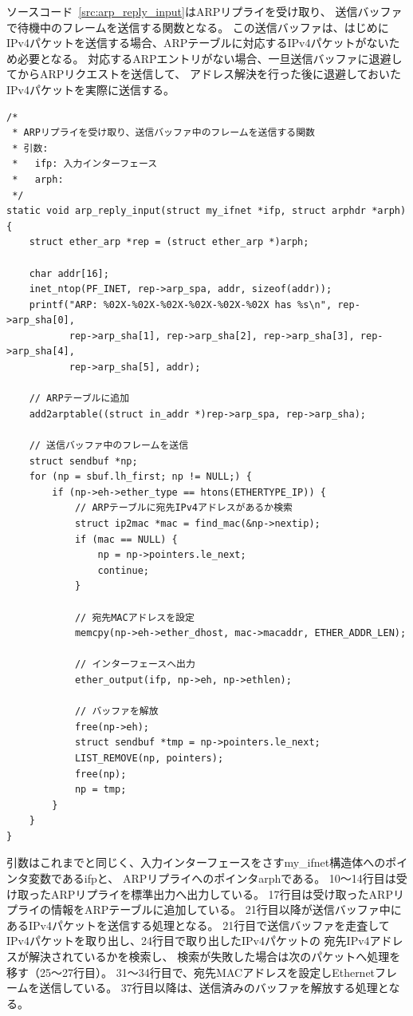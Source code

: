 ソースコード~\ref{src:arp_reply_input}はARPリプライを受け取り、
送信バッファで待機中のフレームを送信する関数となる。
この送信バッファは、はじめにIPv4パケットを送信する場合、ARPテーブルに対応するIPv4パケットがないため必要となる。
対応するARPエントリがない場合、一旦送信バッファに退避してからARPリクエストを送信して、
アドレス解決を行った後に退避しておいたIPv4パケットを実際に送信する。
\begin{lstlisting}[caption=arp\_reply\_input関数,label=src:arp_reply_input]
/*
 * ARPリプライを受け取り、送信バッファ中のフレームを送信する関数
 * 引数:
 *   ifp: 入力インターフェース
 *   arph:
 */
static void arp_reply_input(struct my_ifnet *ifp, struct arphdr *arph) {
    struct ether_arp *rep = (struct ether_arp *)arph;

    char addr[16];
    inet_ntop(PF_INET, rep->arp_spa, addr, sizeof(addr));
    printf("ARP: %02X-%02X-%02X-%02X-%02X-%02X has %s\n", rep->arp_sha[0],
           rep->arp_sha[1], rep->arp_sha[2], rep->arp_sha[3], rep->arp_sha[4],
           rep->arp_sha[5], addr);

    // ARPテーブルに追加
    add2arptable((struct in_addr *)rep->arp_spa, rep->arp_sha);

    // 送信バッファ中のフレームを送信
    struct sendbuf *np;
    for (np = sbuf.lh_first; np != NULL;) {
        if (np->eh->ether_type == htons(ETHERTYPE_IP)) {
            // ARPテーブルに宛先IPv4アドレスがあるか検索
            struct ip2mac *mac = find_mac(&np->nextip);
            if (mac == NULL) {
                np = np->pointers.le_next;
                continue;
            }

            // 宛先MACアドレスを設定
            memcpy(np->eh->ether_dhost, mac->macaddr, ETHER_ADDR_LEN);

            // インターフェースへ出力
            ether_output(ifp, np->eh, np->ethlen);

            // バッファを解放
            free(np->eh);
            struct sendbuf *tmp = np->pointers.le_next;
            LIST_REMOVE(np, pointers);
            free(np);
            np = tmp;
        }
    }
}
\end{lstlisting}
引数はこれまでと同じく、入力インターフェースをさすmy\_ifnet構造体へのポインタ変数であるifpと、
ARPリプライへのポインタarphである。
10〜14行目は受け取ったARPリプライを標準出力へ出力している。
17行目は受け取ったARPリプライの情報をARPテーブルに追加している。
21行目以降が送信バッファ中にあるIPv4パケットを送信する処理となる。
21行目で送信バッファを走査してIPv4パケットを取り出し、24行目で取り出したIPv4パケットの
宛先IPv4アドレスが解決されているかを検索し、
検索が失敗した場合は次のパケットへ処理を移す（25〜27行目）。
31〜34行目で、宛先MACアドレスを設定しEthernetフレームを送信している。
37行目以降は、送信済みのバッファを解放する処理となる。

